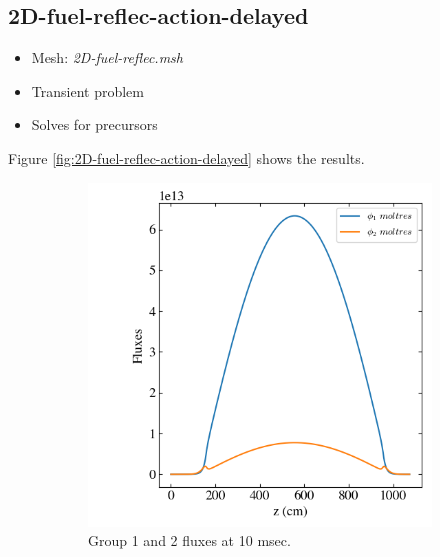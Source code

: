 \documentclass[11pt,letterpaper]{article}
\begin{document}
\subsection{2D-fuel-reflec-action-delayed}

	\begin{itemize}
		\item Mesh: \textit{2D-fuel-reflec.msh}
		\item Transient problem
		\item Solves for precursors
	\end{itemize}

Figure \ref{fig:2D-fuel-reflec-action-delayed} shows the results.

	\begin{figure}[htbp!]
		\centering
		\begin{subfigure}[t]{0.4\textwidth}
			\centering
			\includegraphics[width=\linewidth]{2D-fuel-reflec-action-delayed}
			\caption{Group 1 and 2 fluxes at 10 msec.}
		\end{subfigure}
		\begin{subfigure}[t]{0.4\textwidth}
			\centering

\end{subfigure}
\end{figure}
\end{document}
